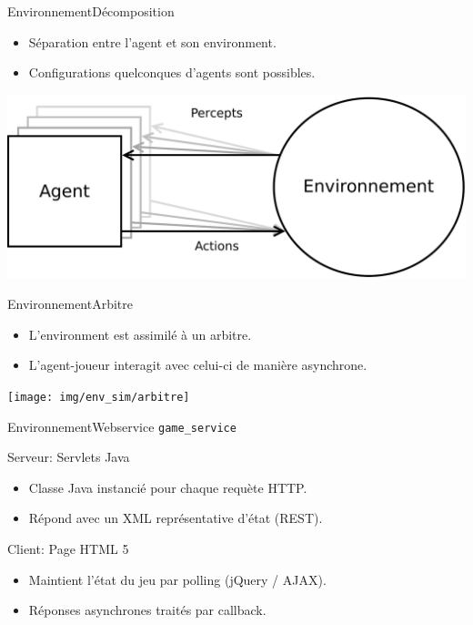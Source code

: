 
\begin{frame}{Environnement}{Décomposition}
\begin{itemize}
\item Séparation entre l'agent et son environment.
\item Configurations quelconques d'agents sont possibles.
\end{itemize}
\includegraphics[width=\textwidth]{img/william/agent_env}\\
\end{frame}


\begin{frame}{Environnement}{Arbitre}
\begin{itemize}
\item L'environment est assimilé à un arbitre.
\item L'agent-joueur interagit avec celui-ci de manière asynchrone.
\end{itemize}
\texttt{[image: img/env\_sim/arbitre]}\\
\end{frame}



\begin{frame}{Environnement}{Webservice \texttt{game\_service}}

\begin{block}{Serveur: Servlets Java}
\begin{itemize}
\item Classe Java instancié pour chaque requète HTTP.
\item Répond avec un XML représentative d'état (REST).
\end{itemize}
\end{block}

\pause

\begin{block}{Client: Page HTML 5}
\begin{itemize}
\item Maintient l'état du jeu par polling (jQuery / AJAX).
\item Réponses asynchrones traités par callback.
\end{itemize}
\end{block}


\end{frame}


